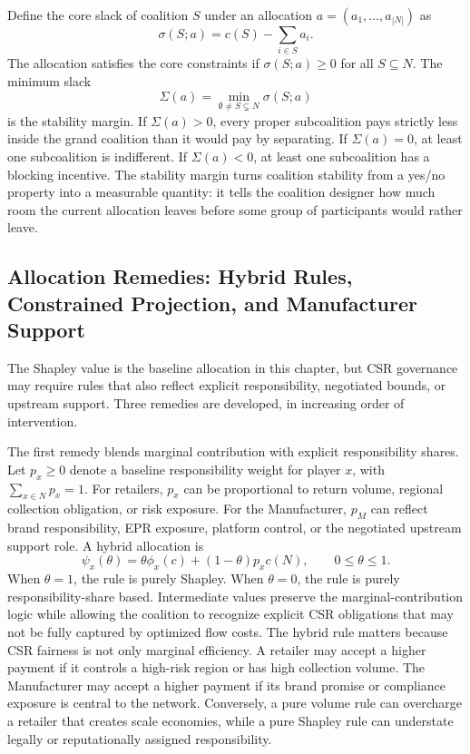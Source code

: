 Define the core slack of coalition $S$ under an allocation $a=(a_1,\ldots,a_{|N|})$ as
\begin{equation}
\label{eq:ch4_core_slack}
\sigma(S;a)=c(S)-\sum_{i\in S}a_i.
\end{equation}
The allocation satisfies the core constraints if $\sigma(S;a)\geq 0$ for all $S\subseteq N$. The minimum slack
\begin{equation}
\label{eq:ch4_stability_margin}
\Sigma(a)=\min_{\emptyset\neq S\subsetneq N}\sigma(S;a)
\end{equation}
is the stability margin. If $\Sigma(a)>0$, every proper subcoalition pays strictly less inside the grand coalition than it would pay by separating. If $\Sigma(a)=0$, at least one subcoalition is indifferent. If $\Sigma(a)<0$, at least one subcoalition has a blocking incentive. The stability margin turns coalition stability from a yes/no property into a measurable quantity: it tells the coalition designer how much room the current allocation leaves before some group of participants would rather leave.

\subsection{Allocation Remedies: Hybrid Rules, Constrained Projection, and Manufacturer Support}

The Shapley value is the baseline allocation in this chapter, but CSR governance may require rules that also reflect explicit responsibility, negotiated bounds, or upstream support. Three remedies are developed, in increasing order of intervention.

The first remedy blends marginal contribution with explicit responsibility shares. Let $p_x\geq 0$ denote a baseline responsibility weight for player $x$, with $\sum_{x\in N}p_x=1$. For retailers, $p_x$ can be proportional to return volume, regional collection obligation, or risk exposure. For the Manufacturer, $p_M$ can reflect brand responsibility, EPR exposure, platform control, or the negotiated upstream support role. A hybrid allocation is
\begin{equation}
\label{eq:ch4_hybrid_allocation}
\psi_x(\theta)=\theta\phi_x(c)+(1-\theta)p_xc(N),
\qquad 0\leq \theta\leq 1.
\end{equation}
When $\theta=1$, the rule is purely Shapley. When $\theta=0$, the rule is purely responsibility-share based. Intermediate values preserve the marginal-contribution logic while allowing the coalition to recognize explicit CSR obligations that may not be fully captured by optimized flow costs. The hybrid rule matters because CSR fairness is not only marginal efficiency. A retailer may accept a higher payment if it controls a high-risk region or has high collection volume. The Manufacturer may accept a higher payment if its brand promise or compliance exposure is central to the network. Conversely, a pure volume rule can overcharge a retailer that creates scale economies, while a pure Shapley rule can understate legally or reputationally assigned responsibility.


